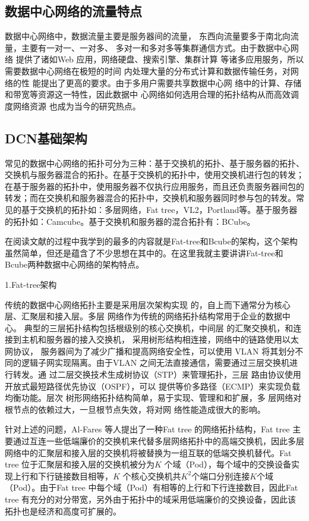 \documentclass[lang=cn,11pt,a4paper,cite=authoryear]{elegantpaper}
\begin{document}
\subsection{数据中心网络的流量特点}

数据中心网络中，数据流量主要是服务器间的流量，
东西向流量要多于南北向流量，主要有一对一、一对多、
多对一和多对多等集群通信方式。由于数据中心网络
提供了诸如Web 应用，网络硬盘、搜索引擎、集群计算
等诸多应用服务，所以需要数据中心网络在极短的时间
内处理大量的分布式计算和数据传输任务，对网络的性
能提出了更高的要求。由于多用户需要共享数据中心网
络中的计算、存储和带宽等资源这一特性，因此数据中
心网络如何选用合理的拓扑结构从而高效调度网络资源
也成为当今的研究热点。

\subsection{DCN基础架构}

常见的数据中心网络的拓扑可分为三种：基于交换机的拓扑、基于服务器的拓扑、交换机与服务器混合的拓扑。在基于交换机的拓扑中，使用交换机进行包的转发；在基于服务器的拓扑中，使用服务器不仅执行应用服务，而且还负责服务器间包的转发；而在交换机和服务器混合的拓扑中，交换机和服务器同时参与包的转发。常见的基于交换机的拓扑如：多层网络，Fat tree，VL2，Portland等。基于服务器的拓扑如：Camcube。基于交换机和服务器的混合拓扑有：BCube。

在阅读文献的过程中我学到的最多的内容就是Fat-tree和Bcube的架构，这个架构虽然简单，但还是蕴含了不少思想在其中的。在这里我就主要讲讲Fat-tree和Bcube两种数据中心网络的架构特点。

1.Fat-tree架构

传统的数据中心网络拓扑主要是采用层次架构实现
的，自上而下通常分为核心层、汇聚层和接入层。多层
网络作为传统的网络拓扑结构常用于企业的数据中心。
典型的三层拓扑结构包括根级别的核心交换机，中间层
的汇聚交换机，和连接到主机和服务器的接入交换机，
采用树形结构相连接，网络中的链路使用以太网协议，
服务器间为了减少广播和提高网络安全性，可以使用
VLAN 将其划分不同的逻辑子网实现隔离。由于VLAN
之间无法直接通信，需要通过三层交换机进行转发。通
过二层交换技术生成树协议（STP）来管理拓扑，三层
路由协议使用开放式最短路径优先协议（OSPF），可以
提供等价多路径（ECMP）来实现负载均衡功能。层次
树形网络拓扑结构简单，易于实现、管理和和扩展，多
层网络对根节点的依赖过大，一旦根节点失效，将对网
络性能造成很大的影响。

针对上述的问题，Al-Fares 等人提出了一种Fat tree 的网络拓扑结构，Fat tree 主要通过互连一些低端廉价的交换机来代替多层网络拓扑中的高端交换机，因此多层网络中的汇聚层和接入层的交换机将被替换为一组互联的低端交换机替代。Fat tree 位于汇聚层和接入层的交换机被分为$K$ 个域（Pod），每个域中的交换设备实现上行和下行链接数目相等，$K$ 个核心交换机共$K^2$个端口分别连接$K$个域（Pod）。由于Fat tree 中每个域（Pod）有相等的上行和下行连接数目，因此Fat tree 有充分的对分带宽，另外由于拓扑中的域采用低端廉价的交换设备，因此该拓扑也是经济和高度可扩展的。
\end{document}
